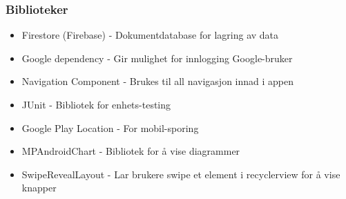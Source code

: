 \subsubsection{Biblioteker}
\begin{itemize}
    \item Firestore (Firebase) - Dokumentdatabase for lagring av data
    \item Google dependency - Gir mulighet for innlogging Google-bruker
    \item Navigation Component - Brukes til all navigasjon innad i appen
    \item JUnit - Bibliotek for enhets-testing
    \item Google Play Location - For mobil-sporing
    \item MPAndroidChart - Bibliotek for å vise diagrammer
    \item SwipeRevealLayout - Lar brukere swipe et element i recyclerview for å vise knapper
\end{itemize}
